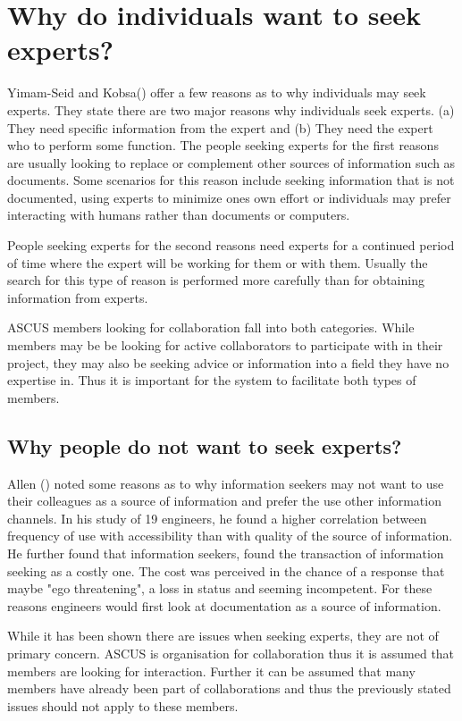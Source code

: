 \documentclass[a4paper,oneside,11pt]{report}
\begin{document}
\section{Why do individuals want to seek experts?}
Yimam-Seid and Kobsa(\citeyear{kobsaseid2003}) offer a few reasons as to why individuals may seek experts. They state there are two major reasons why individuals seek experts. (a) They need specific information from the expert and (b) They need the expert who to perform some function. The people seeking experts for the first reasons are usually looking to replace or complement other sources of information such as documents. Some scenarios for this reason include seeking information that is not documented, using experts to minimize ones own effort or individuals may prefer interacting with humans rather than documents or computers. 

People seeking experts for the second reasons need experts for a continued period of time where the expert will be working for them or with them. Usually the search for this type of reason is performed more carefully than for obtaining information from experts.

ASCUS members looking for collaboration fall into both categories. While members may be be looking for active collaborators to participate with in their project, they may also be seeking advice or information into a field they have no expertise in. Thus it is important for the system to facilitate both types of members.

\subsection{Why people do not want to seek experts?}
Allen (\citeyear{allen1977}) noted some reasons as to why information seekers may not want to use their colleagues as a source of information and prefer the use other information channels. In his study of 19 engineers, he found a higher correlation between frequency of use with accessibility than with quality of the source of information. He further found that information seekers, found the transaction of information seeking as a costly one. The cost was perceived in the chance of a response that maybe "ego threatening", a loss in status and seeming incompetent. For these reasons engineers would first look at documentation as a source of information. 

While it has been shown there are issues when seeking experts, they are not of primary concern. ASCUS is organisation for collaboration thus it is assumed that members are looking for interaction. Further it can be assumed that many members have already been part of collaborations and thus the previously stated issues should not apply to these members.
\end{document}
